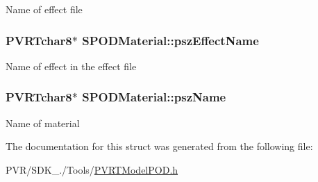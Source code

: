 Name of effect file \hypertarget{struct_s_p_o_d_material_a0c8e2cac3d26187001050c2395f73e4a}{
\subsubsection[{psz\+Effect\+Name}]{\setlength{\rightskip}{0pt plus 5cm}P\+V\+R\+Tchar8$\ast$ S\+P\+O\+D\+Material\+::psz\+Effect\+Name}}\label{struct_s_p_o_d_material_a0c8e2cac3d26187001050c2395f73e4a}
Name of effect in the effect file \hypertarget{struct_s_p_o_d_material_a4ab44cbfc1e19db503075d8082c90429}{
\subsubsection[{psz\+Name}]{\setlength{\rightskip}{0pt plus 5cm}P\+V\+R\+Tchar8$\ast$ S\+P\+O\+D\+Material\+::psz\+Name}}\label{struct_s_p_o_d_material_a4ab44cbfc1e19db503075d8082c90429}
Name of material 

The documentation for this struct was generated from the following file\+:\begin{DoxyCompactItemize}
\item 
P\+V\+R/\+S\+D\+K\+\_./\+Tools/\hyperlink{_p_v_r_t_model_p_o_d_8h}{P\+V\+R\+T\+Model\+P\+O\+D.\+h}\end{DoxyCompactItemize}
